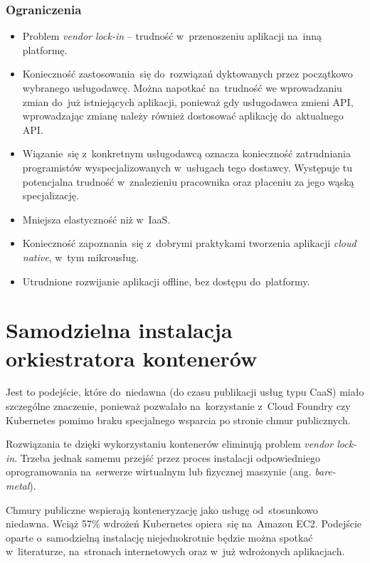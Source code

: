 \documentclass[12pt,a4paper,twoside,titlepage,openright]{book}
\begin{document}
\subsubsection{Ograniczenia}
\begin{itemize}
\item Problem \textit{vendor lock-in} -- trudność w~przenoszeniu aplikacji na~inną platformę.
\item Konieczność zastosowania~się do~rozwiązań dyktowanych przez początkowo wybranego usługodawcę. Można napotkać na~trudność we wprowadzaniu zmian do~już istniejących aplikacji, ponieważ gdy usługodawca zmieni API, wprowadzając zmianę należy również dostosować aplikację do~aktualnego API.
\item Wiązanie~się z~konkretnym usługodawcą oznacza konieczność zatrudniania programistów wyspecjalizowanych w~usługach tego dostawcy. Występuje tu potencjalna trudność w~znalezieniu pracownika oraz płaceniu za jego wąską specjalizację.
\item Mniejsza elastyczność niż w~IaaS.
\item Konieczność zapoznania~się z~dobrymi praktykami tworzenia aplikacji \textit{cloud native}, w~tym mikrousług.
\item Utrudnione rozwijanie aplikacji offline, bez dostępu do~platformy.
\end{itemize}

\section{Samodzielna instalacja orkiestratora kontenerów}\label{section:instalujKontenery}

Jest to podejście, które do~niedawna (do czasu publikacji usług typu CaaS) miało szczególne znaczenie, ponieważ pozwalało na~korzystanie z~Cloud Foundry czy Kubernetes pomimo braku specjalnego wsparcia po stronie chmur publicznych. 

Rozwiązania te dzięki wykorzystaniu kontenerów eliminują problem \textit{vendor lock-in}. Trzeba jednak samemu przejść przez proces instalacji odpowiedniego oprogramowania na~serwerze wirtualnym lub fizycznej maszynie (ang. \textit{bare-metal}).

Chmury publiczne wspierają konteneryzację jako usługę od~stosunkowo niedawna. Wciąż 57\% wdrożeń Kubernetes opiera~się na~Amazon EC2. Podejście oparte o~samodzielną instalację niejednokrotnie będzie można spotkać w~literaturze, na~stronach internetowych oraz w~już wdrożonych aplikacjach.
\end{document}
